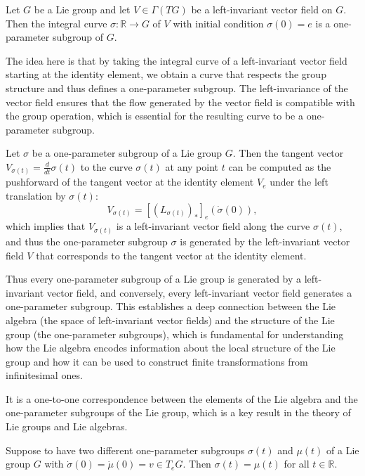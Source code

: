 \begin{proposition}
    Let \(G\) be a Lie group and let \(V \in \Gamma(TG)\) be a left-invariant vector field on \(G\). Then the integral curve \(\sigma : \mathbb{R} \to G\) of \(V\) with initial condition \(\sigma(0) = e\) is a one-parameter subgroup of \(G\).
\end{proposition}

The idea here is that by taking the integral curve of a left-invariant vector field starting at the identity element, we obtain a curve that respects the group structure and thus defines a one-parameter subgroup. The left-invariance of the vector field ensures that the flow generated by the vector field is compatible with the group operation, which is essential for the resulting curve to be a one-parameter subgroup.

\begin{proposition}
    Let \(\sigma\) be a one-parameter subgroup of a Lie group \(G\). Then the tangent vector \(V_{\sigma(t)} = \frac{d}{dt}\sigma(t)\) to the curve \(\sigma(t)\) at any point \(t\) can be computed as the pushforward of the tangent vector at the identity element \(V_e\) under the left translation by \(\sigma(t)\):
    \[
        V_{\sigma(t)}  = [(L_{\sigma(t)})_*]_e (\dot{\sigma}(0)),
    \]
    which implies that \(V_{\sigma(t)}\) is a left-invariant vector field along the curve \(\sigma(t)\), and thus the one-parameter subgroup \(\sigma\) is generated by the left-invariant vector field \(V\) that corresponds to the tangent vector at the identity element.
\end{proposition}

Thus every one-parameter subgroup of a Lie group is generated by a left-invariant vector field, and conversely, every left-invariant vector field generates a one-parameter subgroup. This establishes a deep connection between the Lie algebra (the space of left-invariant vector fields) and the structure of the Lie group (the one-parameter subgroups), which is fundamental for understanding how the Lie algebra encodes information about the local structure of the Lie group and how it can be used to construct finite transformations from infinitesimal ones.

It is a one-to-one correspondence between the elements of the Lie algebra and the one-parameter subgroups of the Lie group, which is a key result in the theory of Lie groups and Lie algebras.

\begin{corollary}
    Suppose to have two different one-parameter subgroups \(\sigma(t)\) and \(\mu(t)\) of a Lie group \(G\) with \(\dot{\sigma}(0) = \dot{\mu}(0) = v \in T_e G\). Then \(\sigma(t) = \mu(t)\) for all \(t \in \mathbb{R}\).
\end{corollary}

